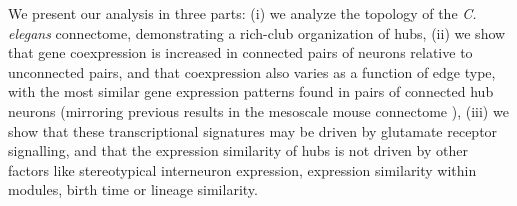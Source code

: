 \documentclass[10pt,letterpaper]{article}
\begin{document}
We present our analysis in three parts:
(i) we analyze the topology of the \emph{C. elegans} connectome, demonstrating a rich-club organization of hubs,
(ii) we show that gene coexpression is increased in connected pairs of neurons relative to unconnected pairs, and that coexpression also varies as a function of edge type, with the most similar gene expression patterns found in pairs of connected hub neurons (mirroring previous results in the mesoscale mouse connectome \cite{Fulcher:2016ck}),
(iii) we show that these transcriptional signatures may be driven by glutamate receptor signalling, and that the expression similarity of hubs is not driven by other factors like stereotypical interneuron expression, expression similarity within modules, birth time or lineage similarity.
\end{document}
